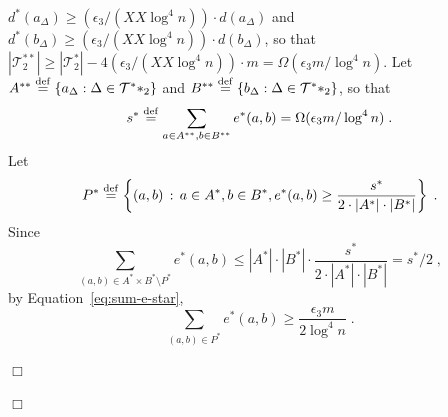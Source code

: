 \documentclass{article}
\newcommand{\eps}{\epsilon}
\newcommand{\eqdef}{\stackrel{\rm def}{=}}
\newcommand{\calT}{{\mathcal{T}}}
\newenvironment{proof}{\smallskip\noindent{\bf Proof:}}%
        {\hspace*{\fill}$\Box$\par}
\begin{document}
\begin{proof}
\begin{proof}
$d^*(a_\Delta) \geq (\eps_3/(XX\log^4 n))\cdot d(a_\Delta)$ and 
$d^*(b_\Delta) \geq (\eps_3/(XX\log^4 n))\cdot d(b_\Delta)$, so that
$|\calT^{**}_2| \geq  |\calT^*_2| - 4 (\eps_3/(XX\log^4 n))\cdot m = \Omega(\eps_3 m/\log^4 n)$.
Let $A^{**} \eqdef \{a_\Delta: \Delta \in \calT^**_2\}$ and $B^{**} \eqdef \{b_\Delta: \Delta \in \calT^**_2\}$,
so that 
\begin{equation}\label{eq:sum-e-double-star}
s^{*} \eqdef \sum_{a\in A^{**}, b\in B^{**}} e^*(a,b) = \Omega(\eps_3 m/\log^4 n)\;.
\end{equation}
\fi
Let 
\begin{equation}\label{eq:def-P-star}
P^{*}\eqdef \left\{(a,b)\,:\, a\in A^{*},b\in B^{*}, e^*(a,b) \geq \frac{s^*}{2\cdot |A^{*}|\cdot|B^{*}|} \right\}\;.
\end{equation}
Since 
\begin{equation}\sum_{(a,b)\in A^*\times B^* \setminus P^{*}} e^*(a,b) \leq |A^*|\cdot |B^*| \cdot \frac{s^*}{2\cdot |A^{*}|\cdot|B^{*}|} = s^*/2\;,
\end{equation}
by Equation~\eqref{eq:sum-e-star},
\begin{equation}\label{eq:sum-P-star}
\sum_{(a,b)\in P^{*}} e^*(a,b) \geq \frac{\eps_3 m}{2\log^4 n}\;.
\end{equation}


\end{proof}
\end{proof}
\end{document}
